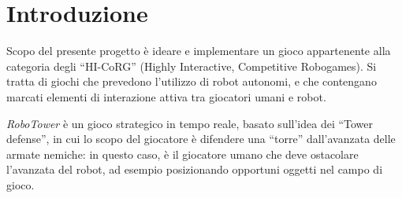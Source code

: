 \chapter{Introduzione}
\label{cap:introduzione}

Scopo del presente progetto è ideare e implementare un gioco appartenente alla categoria degli  ``HI-CoRG'' (Highly Interactive, Competitive Robogames). Si tratta di giochi che prevedono l'utilizzo di robot autonomi, e che contengano marcati elementi di interazione attiva tra giocatori umani e robot.

\emph{RoboTower} è un gioco strategico in tempo reale, basato sull'idea dei ``Tower defense'', in cui lo scopo del giocatore è difendere una ``torre'' dall'avanzata delle armate nemiche: in questo caso, è il giocatore umano che deve ostacolare l'avanzata del robot, ad esempio posizionando opportuni oggetti nel campo di gioco.